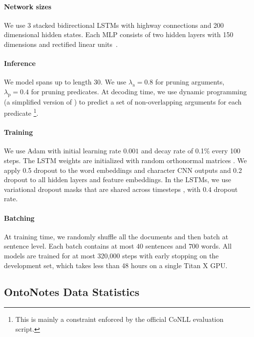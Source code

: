 \documentclass[11pt,a4paper]{article}
\begin{document}
\paragraph{Network sizes}
We use 3 stacked bidirectional LSTMs with highway connections and 200 dimensional hidden states. Each MLP consists of two hidden layers with 150 dimensions and rectified linear units~\cite{relu}.

\paragraph{Inference}
We model spans up to length 30. We use $\lambda_{\text{a}} = 0.8$ for pruning arguments, $\lambda_{\text{p}} = 0.4$ for pruning predicates. At decoding time, we use dynamic programming (a simplified version of ) to predict a set of non-overlapping arguments for each predicate \footnote{This is mainly a constraint enforced by the official CoNLL evaluation script.}.

\paragraph{Training}
We use Adam \cite{kingma:2016} with initial learning rate $0.001$ and decay rate of 0.1\% every 100 steps. The LSTM weights are initialized with random orthonormal matrices \cite{saxe:2013}. We apply 0.5 dropout to the word embeddings and character CNN outputs and 0.2 dropout to all hidden layers and feature embeddings. In the LSTMs, we use variational dropout masks that are shared across timesteps  \cite{gal:2016}, with $0.4$ dropout rate.

\paragraph{Batching}
At training time, we randomly shuffle all the documents and then batch at sentence level. Each batch contains at most $40$ sentences and $700$ words.
All models are trained for at most 320,000 steps with early stopping on the development set, which takes less than 48 hours on a single Titan X GPU. 


\subsection{OntoNotes Data Statistics}\label{sec:data_split}
\end{document}
